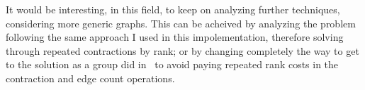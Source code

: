 \documentclass[a4paper,10pt]{article}
\begin{document}
It would be interesting, in this field, to keep on analyzing further techniques, considering more generic graphs. This can be acheived by analyzing the problem following the same approach I used in this impolementation, therefore solving \mstp through repeated contractions by rank; or by changing completely the way to get to the solution as a group did in~\cite{mst-bipartite} to avoid paying repeated rank costs in the contraction and edge count operations.

\clearpage

\printbibliography
\end{document}
